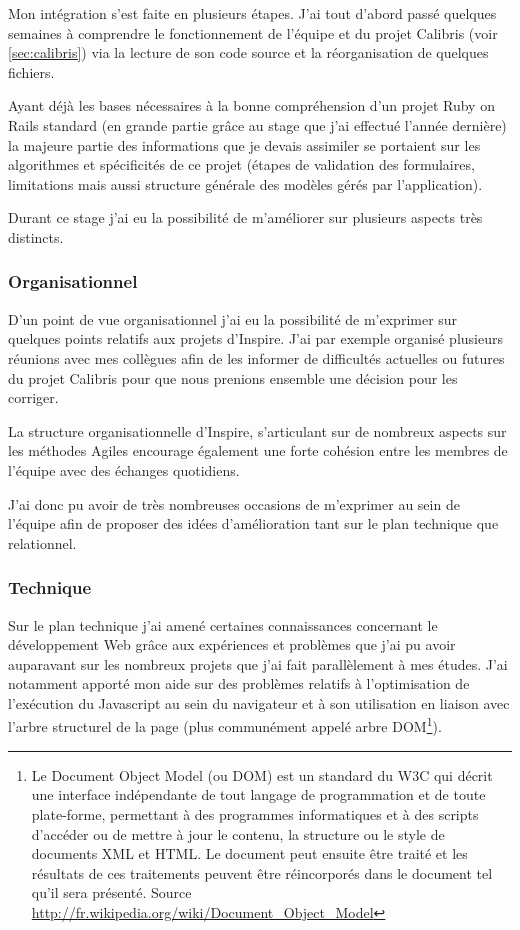 \documentclass[12pt,a4paper]{book}
\begin{document}
Mon intégration s'est faite en plusieurs étapes. J'ai tout d'abord passé quelques semaines à comprendre le fonctionnement de l'équipe et du projet Calibris (voir \cref{sec:calibris}) via la lecture de son code source et la réorganisation de quelques fichiers.

Ayant déjà les bases nécessaires à la bonne compréhension d'un projet Ruby on Rails standard (en grande partie grâce au stage que j'ai effectué l'année dernière) la majeure partie des informations que je devais assimiler se portaient sur les algorithmes et spécificités de ce projet (étapes de validation des formulaires, limitations mais aussi structure générale des modèles gérés par l'application).

Durant ce stage j'ai eu la possibilité de m'améliorer sur plusieurs aspects très distincts.

\subsubsection{Organisationnel}

D'un point de vue organisationnel j'ai eu la possibilité de m'exprimer sur quelques points relatifs aux projets d'Inspire. J'ai par exemple organisé plusieurs réunions avec mes collègues afin de les informer de difficultés actuelles ou futures du projet Calibris pour que nous prenions ensemble une décision pour les corriger.

La structure organisationnelle d'Inspire, s'articulant sur de nombreux aspects sur les méthodes Agiles encourage également une forte cohésion entre les membres de l'équipe avec des échanges quotidiens.

J'ai donc pu avoir de très nombreuses occasions de m'exprimer au sein de l'équipe afin de proposer des idées d'amélioration tant sur le plan technique que relationnel.

\subsubsection{Technique}

Sur le plan technique j'ai amené certaines connaissances concernant le développement Web grâce aux expériences et problèmes que j'ai pu avoir auparavant sur les nombreux projets que j'ai fait parallèlement à mes études. J'ai notamment apporté mon aide sur des problèmes relatifs à l'optimisation de l'exécution du Javascript au sein du navigateur et à son utilisation en liaison avec l'arbre structurel de la page (plus communément appelé arbre DOM\footnote{Le Document Object Model (ou DOM) est un standard du W3C qui décrit une interface indépendante de tout langage de programmation et de toute plate-forme, permettant à des programmes informatiques et à des scripts d'accéder ou de mettre à jour le contenu, la structure ou le style de documents XML et HTML. Le document peut ensuite être traité et les résultats de ces traitements peuvent être réincorporés dans le document tel qu'il sera présenté. Source \url{http://fr.wikipedia.org/wiki/Document_Object_Model}}).
\end{document}
